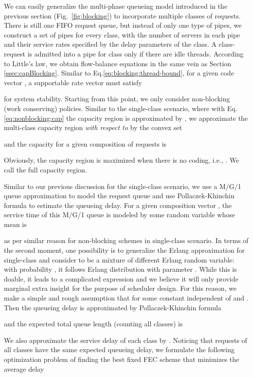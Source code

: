 \documentclass[journal]{IEEEtran}
\begin{document}
We can easily generalize the multi-phase queueing model introduced in the previous section (Fig.~\ref{fig:blocking}) to incorporate multiple classes of requests. There is still one FIFO request queue, but instead of only one type of pipes, we construct a set of pipes for every class, with the number of servers in each pipe and their service rates specified by the delay parameters of the class. A class- request is admitted into a pipe for class  only if there are   idle threads. 
According to Little's law, we obtain flow-balance equations in the same vein as Section \ref{ssec:capBlocking}. Similar to Eq.\ref{eq:blocking:thread-bound}, for a given code vector , a supportable rate vector  must satisfy

for system stability. Starting from this point, we only consider  non-blocking (work conserving) policies. Similar to the single-class scenario, where with Eq.\ref{eq:nonblocking:cap} the capacity region is approximated by , we approximate the multi-class capacity region {\em with respect to } by the convex set

and the capacity for a given composition of requests  is

Obviously, the capacity region is maximized when there is no coding, i.e., . We call  the full capacity region.  


Similar to our previous discussion for the single-class scenario, we use a M/G/1 queue approximation to model the request queue and use Pollaczek-Khinchin formula to estimate the queueing delay. For a given composition vector , the service time of this M/G/1 queue is modeled by some random variable  whose mean is

as per similar reason for non-blocking schemes in single-class scenario. In terms of the second moment, one possibility is to  generalize the Erlang approximation for single-class and consider  to be a mixture of different Erlang random variable: with probability , it follows Erlang distribution with parameter . While this is doable, it leads to a complicated expression and we believe it will only provide marginal extra insight for the purpose of scheduler design. For this reason, we make a simple and rough assumption that  for some constant  independent of  and .
Then the queueing delay is approximated by Pollaczek-Khinchin formula 

and the expected total queue length (counting all classes) is

We also approximate the service delay of each class   by . Noticing that requests of all classes have the same expected queueing delay, we formulate the following optimization problem of finding the best fixed FEC scheme that minimizes the average delay 
\end{document}
